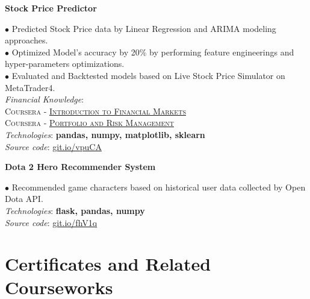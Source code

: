 \documentclass[10pt]{article}
\begin{document}
        \begin{flushleft}
            \textbf{Stock Price Predictor}
        \end{flushleft}
        \vspace{-1.5mm}
        $\bullet$ {Predicted Stock Price data by Linear Regression and ARIMA modeling approaches.} \\
        $\bullet$ {Optimized Model's accuracy by 20\% by performing feature engineerings and hyper-parameters optimizations.} \\
        $\bullet$ {Evaluated and Backtested models based on Live Stock Price Simulator on MetaTrader4.} \\
        \emph{Financial Knowledge}: \\
            \hspace*{5mm} \textsc{Coursera - \href{https://www.coursera.org/account/accomplishments/certificate/K8F27A8BM58Q?utm_medium=certificate&utm_source=link&utm_campaign=copybutton_certificate}{Introduction to Financial Markets}} \\
            \hspace*{5mm} \textsc{Coursera - \href{https://www.coursera.org/account/accomplishments/certificate/34BTLCR3KZNR?utm_medium=certificate&utm_source=link&utm_campaign=copybutton_certificate}{Portfolio and Risk Management}} \\
        \emph{Technologies}: \textbf{pandas, numpy, matplotlib, sklearn} \\
        \emph{Source code}: \href{https://git.io/vpuCA}{git.io/vpuCA} \\


        \begin{flushleft}
            \textbf{Dota 2 Hero Recommender System}
        \end{flushleft}
        \vspace{-1.5mm}
        $\bullet$ {Recommended game characters based on historical user data collected by Open Dota API.} \\
        \emph{Technologies}: \textbf{flask, pandas, numpy} \\
        \emph{Source code}: \href{https://git.io/fhV1q}{git.io/fhV1q}


    \vspace{2mm}
    \section{Certificates and Related Courseworks}
\end{document}
